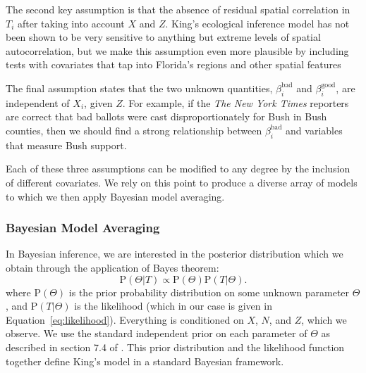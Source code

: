 \documentclass[11pt,titlepage]{article}
\renewcommand{\P}{\text{P}}
\newcommand{\bb}{\beta^{\text{bad}}}
\newcommand{\bg}{\beta^{\text{good}}}
\begin{document}
The second key assumption is that the absence of residual spatial
correlation in $T_i$ after taking into account $X$ and $Z$.  King's
ecological inference model has not been shown to be very sensitive to
anything but extreme levels of spatial autocorrelation, but we make
this assumption even more plausible by including tests with covariates
that tap into Florida's regions and other spatial features

The final assumption states that the two unknown quantities, $\bb_i$
and $\bg_i$, are independent of $X_i$, given $Z$.  For example, if the
\textit{The New York Times} reporters are correct that bad ballots
were cast disproportionately for Bush in Bush counties, then we should
find a strong relationship between $\bb_i$ and variables that measure
Bush support.

Each of these three assumptions can be modified to any degree by the
inclusion of different covariates.  We rely on this point to produce a
diverse array of models to which we then apply Bayesian model
averaging.

\subsubsection{Bayesian Model Averaging}

In Bayesian inference, we are interested in the posterior distribution
which we obtain through the application of Bayes theorem:
\begin{equation}
  \P(\Theta|T) \propto \P(\Theta)\P(T|\Theta).\label{eq:post}
\end{equation}
where $\P(\Theta)$ is the prior probability distribution on some
unknown parameter $\Theta$, and $\P(T|\Theta)$ is the likelihood
(which in our case is given in Equation~\ref{eq:likelihood}).
Everything is conditioned on $X$, $N$, and $Z$, which we observe. We
use the standard independent prior on each parameter of $\Theta$ as
described in section 7.4 of \citet{king:97}.  This prior distribution
and the likelihood function together define King's model in a standard
Bayesian framework.
\end{document}
